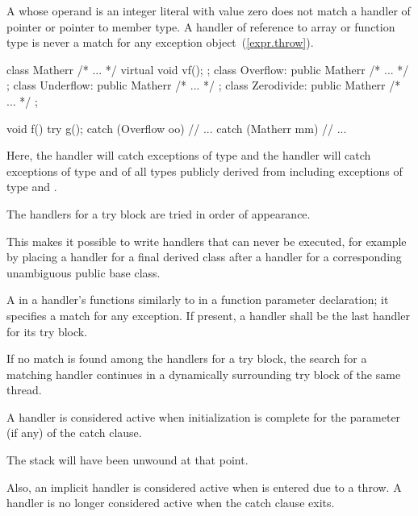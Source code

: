 \begin{note}
A
whose operand is an integer literal with value zero does not match a handler of
pointer or pointer to member type.
A handler of reference to array or function type
is never a match for any exception object~(\ref{expr.throw}).
\end{note}

\begin{example}
\begin{codeblock}
class Matherr { /* ... */ virtual void vf(); };
class Overflow: public Matherr { /* ... */ };
class Underflow: public Matherr { /* ... */ };
class Zerodivide: public Matherr { /* ... */ };

void f() {
  try {
    g();
  } catch (Overflow oo) {
        // ...
  } catch (Matherr mm) {
        // ...
  }
}
\end{codeblock}
Here, the
handler will catch exceptions of type
and the
handler will catch exceptions of type
and of all types publicly derived from
including exceptions of type
and
.
\end{example}

\pnum
The handlers for a try block are tried in order of appearance.
\begin{note}
This makes it possible to write handlers that can never be
executed, for example by placing a handler for a final derived class after
a handler for a corresponding unambiguous public base class.
\end{note}

\pnum
A
in a handler's
functions similarly to
in a function parameter declaration;
it specifies a match for any exception.
If present, a
handler shall be the last handler for its try block.

\pnum
If no match is found among the handlers for a try block,
the search for a matching
handler continues in a dynamically surrounding try block
of the same thread.

\pnum
A handler is considered active when initialization is complete for
the parameter (if any) of the catch clause.
\begin{note}
The stack will have been unwound at that point.
\end{note}
Also, an implicit handler is considered active when
is entered due to a throw. A handler is no longer considered active when the
catch clause exits.


